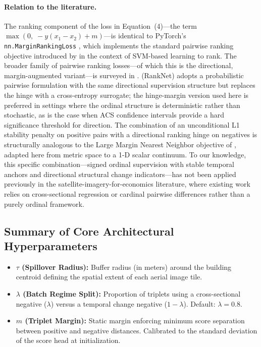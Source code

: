 \documentclass{article}
\begin{document}
\paragraph{Relation to the literature.} The ranking component of the loss in Equation~(4)---the term $\max(0,\; -y(x_1 - x_2) + m)$---is identical to PyTorch's \texttt{nn.MarginRankingLoss} \citep{paszke2019pytorch}, which implements the standard pairwise ranking objective introduced by \citet{joachims2002optimizing} in the context of SVM-based learning to rank. The broader family of pairwise ranking losses---of which this is the directional, margin-augmented variant---is surveyed in \citet{liu2009learning}. \citet{burges2005learning} (RankNet) adopts a probabilistic pairwise formulation with the same directional supervision structure but replaces the hinge with a cross-entropy surrogate; the hinge-margin version used here is preferred in settings where the ordinal structure is deterministic rather than stochastic, as is the case when ACS confidence intervals provide a hard significance threshold for direction. The combination of an unconditional L1 stability penalty on positive pairs with a directional ranking hinge on negatives is structurally analogous to the Large Margin Nearest Neighbor objective of \citet{weinberger2009distance}, adapted here from metric space to a 1-D scalar continuum. To our knowledge, this specific combination---signed ordinal supervision with stable temporal anchors and directional structural change indicators---has not been applied previously in the satellite-imagery-for-economics literature, where existing work relies on cross-sectional regression \citep{jean2016combining} or cardinal pairwise differences \citep{yeh2020using} rather than a purely ordinal framework.

\subsection*{Summary of Core Architectural Hyperparameters}
\begin{itemize}
    \item \textbf{$\tau$ (Spillover Radius):} Buffer radius (in meters) around the building centroid defining the spatial extent of each aerial image tile.
    \item \textbf{$\lambda$ (Batch Regime Split):} Proportion of triplets using a cross-sectional negative ($\lambda$) versus a temporal change negative ($1 - \lambda$). Default: $\lambda = 0.8$.
    \item \textbf{$m$ (Triplet Margin):} Static margin enforcing minimum score separation between positive and negative distances. Calibrated to the standard deviation of the score head at initialization.
\end{itemize}
\end{document}
